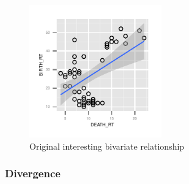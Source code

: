 \begin{figure}
 \centering 
\includegraphics[width=2.25in,height=2.25in]{images/DEATH_RT-BIRTH_RT.pdf}
  \caption{Original interesting bivariate relationship}
 \label{fig:original2}
\end{figure}

\subsubsection{Divergence}



